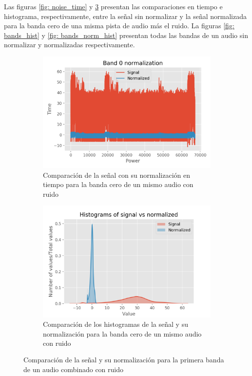 Las figuras \ref{fig: noise_time} y \ref{fig: norm_hist} presentan las comparaciones en tiempo e histograma, respectivamente, entre la señal sin normalizar y la señal normalizada para la banda cero de una misma pista de audio más el ruido. La figuras \ref{fig: bands_hist} y \ref{fig: bands_norm_hist} presentan todas las bandas de un audio sin normalizar y normalizadas respectivamente.

\begin{figure}[t!]
	\centering
	\begin{subfigure}[t]{0.5\textwidth}
		\centering
		\includegraphics[width=\columnwidth]{figures/band0_norm}
		\caption{Comparación de la señal con su normalización en tiempo para la banda cero de un mismo audio con ruido}
		\label{fig: norm_time}
	\end{subfigure}%
	\hspace*{10pt}
	\begin{subfigure}[t]{0.5\textwidth}
		\centering
		\includegraphics[width=\columnwidth]{figures/band0_norm_hist}
		\caption{Comparación de los histogramas de la señal y su normalización para la banda cero de un mismo audio con ruido}
		\label{fig: norm_hist}
	\end{subfigure}
	\caption{Comparación de la señal y su normalización para la primera banda de un audio combinado con ruido}
\end{figure}

